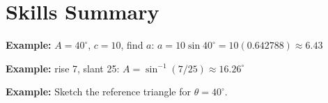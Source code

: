 \documentclass[12pt]{article}
\newcommand{\ans}[1]{\boldsymbol{#1}}
\begin{document}
\section*{Skills Summary}

\begin{examplebox}
\textbf{Example:} $A = 40^\circ$, $c = 10$, find $a$: \quad $a = 10\sin 40^\circ = 10(0.642788) \approx \ans{6.43}$
\end{examplebox}

\begin{examplebox}
\textbf{Example:} rise 7, slant 25: \quad $A = \sin^{-1}(7/25) \approx \ans{16.26^\circ}$
\end{examplebox}

\begin{examplebox}
\textbf{Example:} Sketch the reference triangle for $\theta = 40^\circ$.
\end{examplebox}
\end{document}
